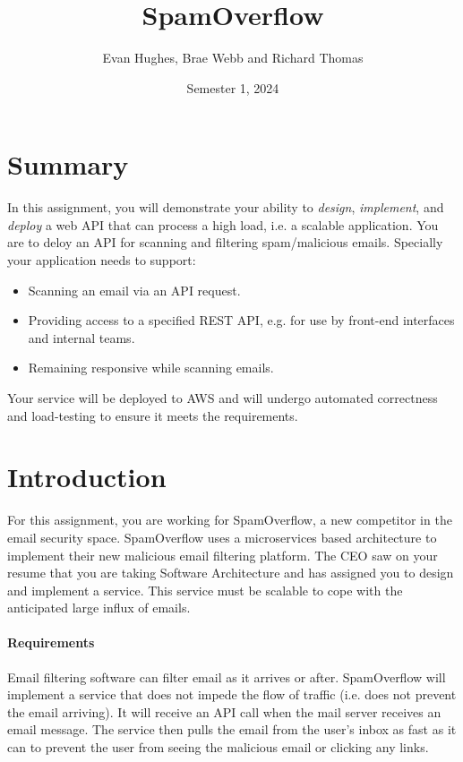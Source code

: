 \documentclass{csse4400}
\title{SpamOverflow}
\author{Evan Hughes, Brae Webb and Richard Thomas}
\date{Semester 1, 2024}
\begin{document}

\maketitle


\section*{Summary}
In this assignment, you will demonstrate your ability to \textsl{design},
\textsl{implement}, and \textsl{deploy} a web API that can process a high load,
i.e. a scalable application.
You are to deloy an API for scanning and filtering spam/malicious emails.
Specially your application needs to support:
\begin{itemize}
    \item Scanning an email via an API request.
    \item Providing access to a specified REST API, e.g. for use by front-end interfaces and internal teams.
    \item Remaining responsive while scanning emails.
\end{itemize}

\noindent
Your service will be deployed to AWS and will undergo automated correctness and load-testing to ensure it meets the requirements.

\section{Introduction}

For this assignment, you are working for SpamOverflow, a new competitor in the email security space. SpamOverflow uses a microservices based architecture to implement their new malicious email filtering platform. The CEO saw on your resume that you are taking Software Architecture and has assigned you to design and implement a service. This service must be scalable to cope with the anticipated large influx of emails.

\paragraph{Requirements}
Email filtering software can filter email as it arrives or after.
SpamOverflow will implement a service that does not impede the flow of traffic (i.e. does not prevent the email arriving).
It will receive an API call when the mail server receives an email message.
The service then pulls the email from the user's inbox as fast as it can to prevent the user from seeing the malicious email or clicking any links.
\end{document}
